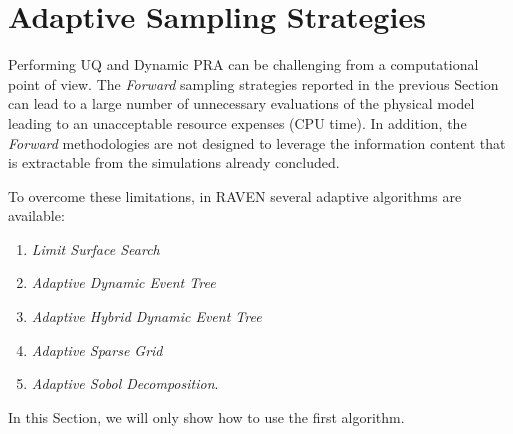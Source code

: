 \section{Adaptive Sampling Strategies}
Performing UQ and Dynamic PRA can be
challenging from a computational point of view. The \textit{Forward}
sampling strategies reported in the previous Section can lead to a large number of
unnecessary evaluations of the physical model leading to an unacceptable resource expenses (CPU time).
In addition, the \textit{Forward} methodologies are not designed to leverage the information
content that is extractable from the simulations already concluded.

To overcome these limitations, in RAVEN several adaptive algorithms are available:
\begin{enumerate}
  \item \textit{Limit Surface Search}
  \item \textit{Adaptive Dynamic Event Tree}
  \item \textit{Adaptive Hybrid Dynamic Event Tree}
  \item \textit{Adaptive Sparse Grid}
  \item \textit{Adaptive Sobol Decomposition}.
\end{enumerate}
In this Section, we will only show how to use the first algorithm.

